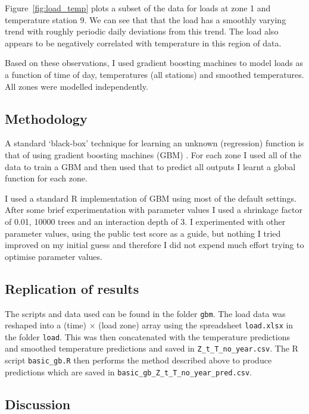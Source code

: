 \documentclass[preprint,authoryear,12pt]{elsarticle}
\begin{document}
Figure~\ref{fig:load_temp} plots a subset of the data for loads at zone 1 and temperature station 9.
We can see that that the load has a smoothly varying trend with roughly periodic daily deviations from this trend.
The load also appears to be negatively correlated with temperature in this region of data.

Based on these observations, I used gradient boosting machines to model loads as a function of time of day, temperatures (all stations) and smoothed temperatures.
All zones were modelled independently.

\subsection{Methodology}

A standard `black-box' technique for learning an unknown (regression) function is that of using gradient boosting machines (GBM) \citep[e.g. chapter 10 of][]{Hastie2009}.
For each zone I used all of the data to train a GBM and then used that to predict all outputs \ie I learnt a global function for each zone.

I used a standard R implementation of GBM using most of the default settings\footnotemark.
After some brief experimentation with parameter values I used a shrinkage factor of 0.01, 10000 trees and an interaction depth of 3.
I experimented with other parameter values, using the public test score as a guide, but nothing I tried improved on my initial guess and therefore I did not expend much effort trying to optimise parameter values.


\subsection{Replication of results}

The scripts and data used can be found in the folder \texttt{gbm}.
The load data was reshaped into a (time) $\times$ (load zone) array using the spreadsheet \texttt{load.xlsx} in the folder \texttt{load}.
This was then concatenated with the temperature predictions and smoothed temperature predictions and saved in \texttt{Z\_t\_T\_no\_year.csv}.
The R script \texttt{basic\_gb.R} then performs the method described above to produce predictions which are saved in \texttt{basic\_gb\_Z\_t\_T\_no\_year\_pred.csv}.

\subsection{Discussion}
\end{document}
